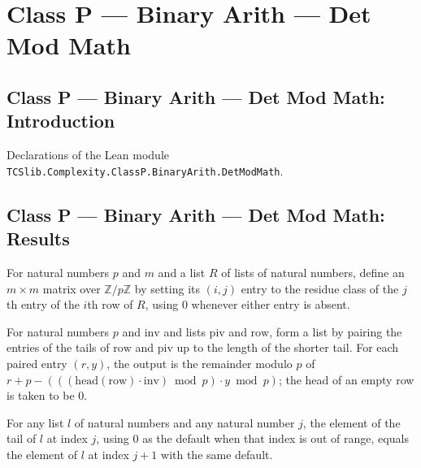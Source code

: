 \section{Class P --- Binary Arith --- Det Mod Math}
\subsection*{Class P --- Binary Arith --- Det Mod Math: Introduction}

Declarations of the Lean module \texttt{TCSlib.Complexity.ClassP.BinaryArith.DetModMath}.

\subsection*{Class P --- Binary Arith --- Det Mod Math: Results}

\begin{definition}
\label{Complexity.BinArith.matOfRows}
\leanok
For natural numbers $p$ and $m$ and a list $R$ of lists of natural numbers, define an
$m\times m$ matrix over $\mathbb Z/p\mathbb Z$ by setting its $(i,j)$ entry to the
residue class of the $j$th entry of the $i$th row of $R$, using $0$ whenever either
entry is absent.
\end{definition}

\begin{definition}
\label{Complexity.BinArith.elimRow}
\leanok
For natural numbers $p$ and $\mathrm{inv}$ and lists $\mathrm{piv}$ and $\mathrm{row}$,
form a list by pairing the entries of the tails of $\mathrm{row}$ and $\mathrm{piv}$ up
to the length of the shorter tail. For each paired entry $(r,y)$, the output is the
remainder modulo $p$ of $r+p-(((\mathrm{head}(\mathrm{row})\cdot\mathrm{inv})\bmod
p)\cdot y\bmod p)$; the head of an empty row is taken to be $0$.
\end{definition}

\begin{theorem}
\label{Complexity.BinArith.getD_tail}
\leanok
{}
For any list $l$ of natural numbers and any natural number $j$, the element of the tail
of $l$ at index $j$, using $0$ as the default when that index is out of range, equals
the element of $l$ at index $j+1$ with the same default.
\end{theorem}

